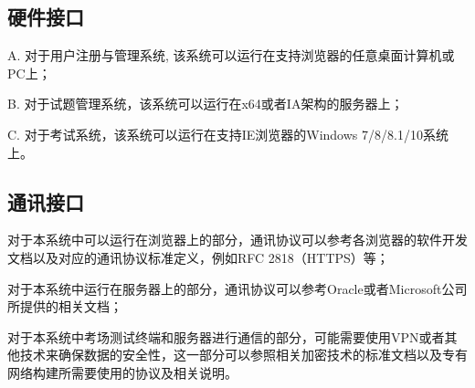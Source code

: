 \subsection{硬件接口}
A. 对于用户注册与管理系统, 该系统可以运行在支持浏览器的任意桌面计算机或PC上；

B. 对于试题管理系统，该系统可以运行在x64或者IA架构的服务器上；

C. 对于考试系统，该系统可以运行在支持IE浏览器的Windows 7/8/8.1/10系统上。

\subsection{通讯接口}
对于本系统中可以运行在浏览器上的部分，通讯协议可以参考各浏览器的软件开发文档以及对应的通讯协议标准定义，例如RFC 2818（HTTPS）等；

对于本系统中运行在服务器上的部分，通讯协议可以参考Oracle或者Microsoft公司所提供的相关文档；

对于本系统中考场测试终端和服务器进行通信的部分，可能需要使用VPN或者其他技术来确保数据的安全性，这一部分可以参照相关加密技术的标准文档以及专有网络构建所需要使用的协议及相关说明。
